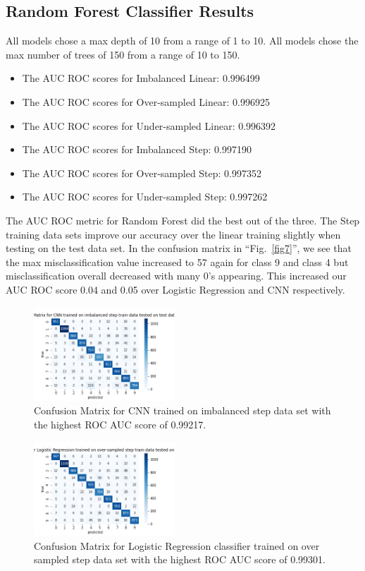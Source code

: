 \documentclass[Dealing with Imbalance in Computer Vision]{IEEEtran}
\begin{document}
\subsection{Random Forest Classifier Results} 
All models chose a max depth of 10 from a range of 1 to 10.
All models chose the max number of trees of 150 from a range of 10 to 150.
\begin{itemize}
    \item The AUC ROC scores for Imbalanced Linear: 0.996499
    \item The AUC ROC scores for Over-sampled Linear: 0.996925
    \item The AUC ROC scores for Under-sampled Linear: 0.996392
    \item The AUC ROC scores for Imbalanced Step: 0.997190
    \item The AUC ROC scores for Over-sampled Step: 0.997352
    \item The AUC ROC scores for Under-sampled Step: 0.997262
\end{itemize}
The AUC ROC metric for Random Forest did the best out of the three. The Step training data sets improve our accuracy over the linear training slightly when testing on the test data set. In the confusion matrix in ``Fig.~\ref{fig7}'', we see that the max misclassification value increased to 57 again for class 9 and class 4 but misclassification overall decreased with many 0's appearing. This increased our AUC ROC score 0.04 and 0.05 over Logistic Regression and CNN respectively.
\begin{figure}[]
\centerline{\includegraphics[width=200px]{Confusion_Matrix_CNN_trained_imbalanced_step_train.png}}
\caption{Confusion Matrix for CNN trained on imbalanced step data set with the highest ROC AUC score of 0.99217.}
\label{fig5}
\end{figure}

\begin{figure}[]
\centerline{\includegraphics[width=200px]{Confusion_Matrix_Logistic Regression_trained_over-sampled_step_train.png}}
\caption{Confusion Matrix for Logistic Regression classifier trained on over sampled step data set with the highest ROC AUC score of 0.99301.}
\label{fig6}
\end{figure}
\end{document}
